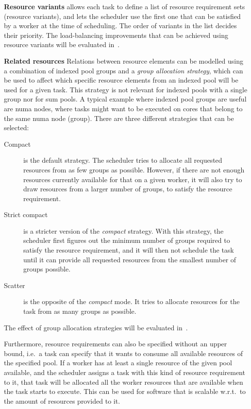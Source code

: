 \textbf{Resource variants} \hyperqueue{} allows each task to define a list of resource
requirement sets (resource variants), and lets the scheduler use the first one that can be
satisfied by a worker at the time of scheduling. The order of variants in the list decides their
priority. The load-balancing improvements that can be achieved using resource variants will be
evaluated in~.

\textbf{Related resources}
Relations between resource elements can be modelled using a combination of indexed pool groups and
a \emph{group allocation strategy}, which can be used to affect which specific resource elements from an
indexed pool will be used for a given task. This strategy is not relevant for indexed pools with a
single group nor for sum pools. A typical example where indexed pool groups are useful are
\gls{numa} nodes, where tasks might want to be executed on cores that belong to the
same \gls{numa} node (group). There are three different strategies that can be selected:
\begin{description}
	\item [Compact] is the default strategy. The scheduler tries to allocate all requested
	      resources from as few groups as possible. However, if there are not enough resources currently
	      available for that on a given worker, it will also try to draw resources from a larger number of
	      groups, to satisfy the resource requirement.
	\item [Strict compact] is a stricter version of the \emph{compact} strategy. With this
	      strategy, the scheduler first figures out the minimum number of groups required to satisfy the
	      resource requirement, and it will then not schedule the task until it can provide all requested
	      resources from the smallest number of groups possible.
	\item [Scatter] is the opposite of the \emph{compact} mode. It tries to allocate resources
	      for the task from as many groups as possible.
\end{description}

The effect of group allocation strategies will be evaluated in~.

Furthermore, resource requirements can also be specified without an upper bound, i.e.\ a task can
specify that it wants to consume all available resources of the specified pool. If a worker has at
least a single resource of the given pool available, and the scheduler assigns a task with this
kind of resource requirement to it, that task will be allocated all the worker resources that are
available when the task starts to execute. This can be used for software that is scalable w.r.t.\
to the amount of resources provided to it.

